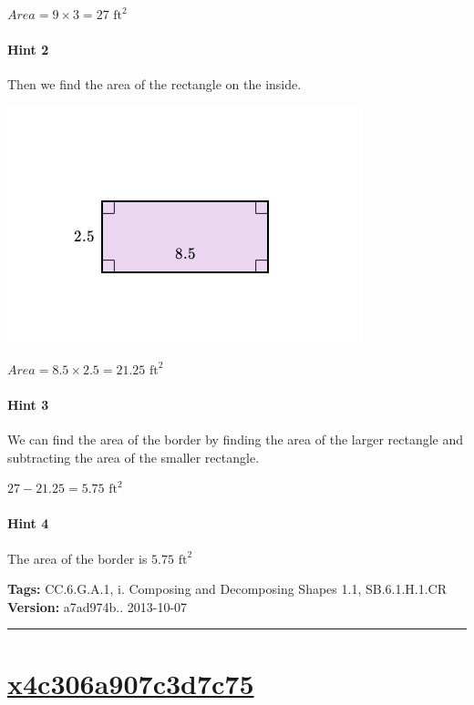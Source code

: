 \documentclass[twocolumn,10pt]{article}
\def\shrinkfactor{0.55}
\begin{document}
$Area=9\times3=27  \text{ ft}^2$  

\paragraph{Hint 2}Then we find the area of the rectangle on the inside.  


\includegraphics[scale=\shrinkfactor]{figures/37cac3066659606b57259837537cc3ba672dcc2a.png}  

$Area=8.5\times2.5=21.25  \text{ ft}^2$  

\paragraph{Hint 3}We can find the area of the border by finding the area of the larger rectangle and subtracting the area of the smaller rectangle. 

$27-21.25=5.75\text{ ft}^2$ 

\paragraph{Hint 4}The area of the border is $5.75\text{ ft}^2$ 



\medskip
\noindent
\textbf{Tags:} {\footnotesize CC.6.G.A.1, i.	Composing and Decomposing Shapes 1.1, SB.6.1.H.1.CR}\\
\textbf{Version:} a7ad974b.. 2013-10-07
\smallskip\hrule





\section{\href{https://www.khanacademy.org/devadmin/content/items/x4c306a907c3d7c75}{x4c306a907c3d7c75}}
\end{document}
